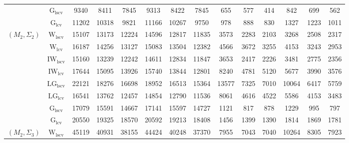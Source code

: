 \begin{table}[!ht]
{\begin{tabular}{@{}cc|ccc|ccc|ccc|ccc@{}}
 & $\mathrm{G}_{\mathrm{lscv}}$ & 9340 & 8411 & 7845 & 9313 & 8422 & 7845 & \cellcolor{black!30}655 & \cellcolor{black!30}577 & \cellcolor{black!30}414 & \cellcolor{black!30}842 & \cellcolor{black!30}699 & \cellcolor{black!30}562 \\ 
 & $\mathrm{G}_{\mathrm{lcv}}$ & 11202 & 10318 & 9821 & 11166 & 10267 & 9750 & \cellcolor{black!10}978 & \cellcolor{black!10}888 & \cellcolor{black!10}830 & \cellcolor{black!10}1327 & \cellcolor{black!10}1223 & \cellcolor{black!10}1011 \\ 
\midrule
$(M_2,\Sigma_2)$ & $\mathrm{W}_{\mathrm{lscv}}$ & \cellcolor{black!30}15107 & \cellcolor{black!30}13173 & \cellcolor{black!30}12224 & \cellcolor{black!30}14596 & \cellcolor{black!10}12817 & \cellcolor{black!10}11835 & 3573 & 2283 & 2103 & 3268 & 2508 & 2317 \\ 
 & $\mathrm{W}_{\mathrm{lcv}}$ & 16187 & 14256 & 13127 & 15083 & 13504 & 12382 & 4566 & 3672 & 3255 & 4153 & 3243 & 2953 \\ 
 & $\mathrm{IW}_{\mathrm{lscv}}$ & \cellcolor{black!10}15160 & \cellcolor{black!10}13239 & \cellcolor{black!10}12242 & \cellcolor{black!10}14611 & 12834 & 11847 & 3653 & 2417 & 2226 & 3481 & 2775 & 2356 \\ 
 & $\mathrm{IW}_{\mathrm{lcv}}$ & 17644 & 15095 & 13926 & 15740 & 13844 & 12801 & 8240 & 4781 & 5120 & 5677 & 3990 & 3576 \\ 
 & $\mathrm{LG}_{\mathrm{lscv}}$ & 22121 & 18276 & 16698 & 18952 & 16513 & 15364 & 13577 & 7325 & 7010 & 10064 & 6417 & 5759 \\ 
 & $\mathrm{LG}_{\mathrm{lcv}}$ & 16541 & 13762 & 12457 & 14854 & \cellcolor{black!30}12790 & \cellcolor{black!30}11536 & 8061 & 4616 & 4522 & 5586 & 4153 & 3483 \\ 
 & $\mathrm{G}_{\mathrm{lscv}}$ & 17079 & 15591 & 14667 & 17141 & 15597 & 14727 & \cellcolor{black!30}1121 & \cellcolor{black!30}817 & \cellcolor{black!30}878 & \cellcolor{black!30}1229 & \cellcolor{black!30}995 & \cellcolor{black!30}797 \\ 
 & $\mathrm{G}_{\mathrm{lcv}}$ & 20550 & 19325 & 18570 & 20592 & 19213 & 18408 & \cellcolor{black!10}1456 & \cellcolor{black!10}1399 & \cellcolor{black!10}1390 & \cellcolor{black!10}1814 & \cellcolor{black!10}1869 & \cellcolor{black!10}1781 \\ 
\midrule
$(M_2,\Sigma_3)$ & $\mathrm{W}_{\mathrm{lscv}}$ & \cellcolor{black!10}45119 & \cellcolor{black!10}40931 & \cellcolor{black!10}38155 & 44424 & 40248 & 37370 & \cellcolor{black!10}7955 & \cellcolor{black!10}7043 & \cellcolor{black!10}7040 & \cellcolor{black!10}10264 & \cellcolor{black!10}8305 & \cellcolor{black!10}7923 \\ 

\end{tabular}}
\end{table}
